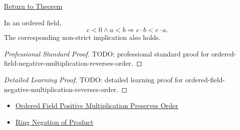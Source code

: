 \newpage
{}
\label{prf:ordered-field-negative-multiplication-reverses-order}

\begin{remark*}[Return]
\hyperref[thm:ordered-field-negative-multiplication-reverses-order]{Return to Theorem}
\end{remark*}

\begin{theorem*}
In an ordered field,
\[
c<0\land a<b
\Longrightarrow
c\cdot b<c\cdot a.
\]
The corresponding non-strict implication also holds.
\end{theorem*}

\begin{proof}[Professional Standard Proof]
\LRAProofBodyStart
TODO: professional standard proof for ordered-field-negative-multiplication-reverses-order.
\end{proof}

\begin{proof}[Detailed Learning Proof]
\LRAProofBodyStart
TODO: detailed learning proof for ordered-field-negative-multiplication-reverses-order.
\end{proof}

\begin{remark*}
\end{remark*}

\begin{dependencies}
\begin{itemize}
  \item \hyperref[thm:ordered-field-positive-multiplication-preserves-order]{Ordered Field Positive Multiplication Preserves Order}
  \item \hyperref[thm:ring-negation-of-product]{Ring Negation of Product}
\end{itemize}
\end{dependencies}

\clearpage
